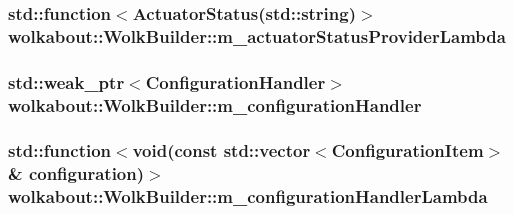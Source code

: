 \subsubsection[{\texorpdfstring{m\+\_\+actuator\+Status\+Provider\+Lambda}{m_actuatorStatusProviderLambda}}]{\setlength{\rightskip}{0pt plus 5cm}std\+::function$<$Actuator\+Status(std\+::string)$>$ wolkabout\+::\+Wolk\+Builder\+::m\+\_\+actuator\+Status\+Provider\+Lambda\hspace{0.3cm}{\ttfamily [private]}}\hypertarget{classwolkabout_1_1_wolk_builder_a004905693c244d1616f0ee9fc79f1e0d}{}\label{classwolkabout_1_1_wolk_builder_a004905693c244d1616f0ee9fc79f1e0d}
\subsubsection[{\texorpdfstring{m\+\_\+configuration\+Handler}{m_configurationHandler}}]{\setlength{\rightskip}{0pt plus 5cm}std\+::weak\+\_\+ptr$<$Configuration\+Handler$>$ wolkabout\+::\+Wolk\+Builder\+::m\+\_\+configuration\+Handler\hspace{0.3cm}{\ttfamily [private]}}\hypertarget{classwolkabout_1_1_wolk_builder_ae0103becc951fbb1da1364e9d6f34907}{}\label{classwolkabout_1_1_wolk_builder_ae0103becc951fbb1da1364e9d6f34907}
\subsubsection[{\texorpdfstring{m\+\_\+configuration\+Handler\+Lambda}{m_configurationHandlerLambda}}]{\setlength{\rightskip}{0pt plus 5cm}std\+::function$<$void(const std\+::vector$<$Configuration\+Item$>$\& configuration)$>$ wolkabout\+::\+Wolk\+Builder\+::m\+\_\+configuration\+Handler\+Lambda\hspace{0.3cm}{\ttfamily [private]}}\hypertarget{classwolkabout_1_1_wolk_builder_a1d8ed6ff181db71100a627520933fb4b}{}\label{classwolkabout_1_1_wolk_builder_a1d8ed6ff181db71100a627520933fb4b}
